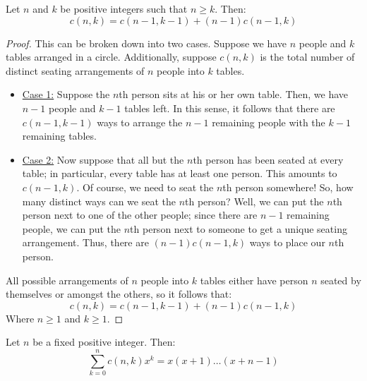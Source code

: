 \documentclass[letterpaper]{article}
\begin{document}
\begin{theorem}{}{}
    Let $n$ and $k$ be positive integers such that $n \geq k$. Then:
    \[c(n, k) = c(n - 1, k - 1) + (n - 1)c(n - 1, k)\]
\end{theorem}

\begin{proof}
    This can be broken down into two cases. Suppose we have $n$ people and $k$ tables arranged in a circle. Additionally, suppose $c(n, k)$ is the total number of distinct seating arrangements of $n$ people into $k$ tables. 
    \begin{itemize}
        \item \underline{Case 1:} Suppose the $n$th person sits at his or her own table. Then, we have $n - 1$ people and $k - 1$ tables left. In this sense, it follows that there are $c(n - 1, k - 1)$ ways to arrange the $n - 1$ remaining people with the $k - 1$ remaining tables. 
        \item \underline{Case 2:} Now suppose that all but the $n$th person has been seated at every table; in particular, every table has at least one person. This amounts to $c(n - 1, k)$. Of course, we need to seat the $n$th person somewhere! So, how many distinct ways can we seat the $n$th person? Well, we can put the $n$th person next to one of the other people; since there are $n - 1$ remaining people, we can put the $n$th person next to someone to get a unique seating arrangement. Thus, there are $(n - 1)c(n - 1, k)$ ways to place our $n$th person.
    \end{itemize}
    All possible arrangements of $n$ people into $k$ tables either have person $n$ seated by themselves or amongst the others, so it follows that:
    \[c(n, k) = c(n - 1, k - 1) + (n - 1)c(n - 1, k)\]
    Where $n \geq 1$ and $k \geq 1$. \qedhere 
\end{proof}

\begin{lemma}{}{}
    Let $n$ be a fixed positive integer. Then:
    \[\sum_{k = 0}^n c(n, k) x^k = x(x + 1)\dots (x + n - 1)\]
\end{lemma}
\end{document}
